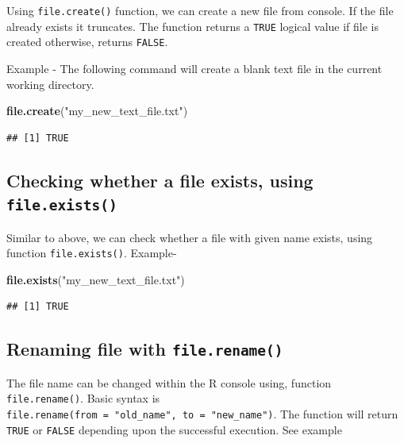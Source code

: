 \documentclass[
]{book}
\newenvironment{Shaded}{\begin{snugshade}}{\end{snugshade}}
\newcommand{\FunctionTok}[1]{\textcolor[rgb]{0.13,0.29,0.53}{\textbf{#1}}}
\newcommand{\NormalTok}[1]{#1}
\newcommand{\StringTok}[1]{\textcolor[rgb]{0.31,0.60,0.02}{#1}}
\begin{document}
Using \texttt{file.create()} function, we can create a new file from console. If the file already exists it truncates. The function returns a \texttt{TRUE} logical value if file is created otherwise, returns \texttt{FALSE}.

Example - The following command will create a blank text file in the current working directory.

\begin{Shaded}
\begin{Highlighting}[]
\FunctionTok{file.create}\NormalTok{(}\StringTok{"my\_new\_text\_file.txt"}\NormalTok{)}
\end{Highlighting}
\end{Shaded}

\begin{verbatim}
## [1] TRUE
\end{verbatim}

\hypertarget{checking-whether-a-file-exists-using-file.exists}{%
\subsection{\texorpdfstring{Checking whether a file exists, using \texttt{file.exists()}}{Checking whether a file exists, using file.exists()}}\label{checking-whether-a-file-exists-using-file.exists}}

Similar to above, we can check whether a file with given name exists, using function \texttt{file.exists()}. Example-

\begin{Shaded}
\begin{Highlighting}[]
\FunctionTok{file.exists}\NormalTok{(}\StringTok{"my\_new\_text\_file.txt"}\NormalTok{)}
\end{Highlighting}
\end{Shaded}

\begin{verbatim}
## [1] TRUE
\end{verbatim}

\hypertarget{renaming-file-with-file.rename}{%
\subsection{\texorpdfstring{Renaming file with \texttt{file.rename()}}{Renaming file with file.rename()}}\label{renaming-file-with-file.rename}}

The file name can be changed within the R console using, function \texttt{file.rename()}. Basic syntax is \texttt{file.rename(from\ =\ "old\_name",\ to\ =\ "new\_name")}. The function will return \texttt{TRUE} or \texttt{FALSE} depending upon the successful execution. See example
\end{document}
